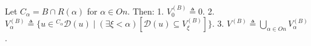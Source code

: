 Let $C_{\alpha} = B \cap R(\alpha)$ for $\alpha \in On$. Then:
1. $V_{0}^{(B)} \triangleq 0$.
2. $V_{\alpha}^{(B)} \triangleq \{u \in {}^{C_{\alpha}}\mathcal{D}(u) \mid (\exists \xi < \alpha)[\mathcal{D}(u) \subseteq V_{\xi}^{(B)}]\}$.
3. $V^{(B)} \triangleq \bigcup_{\alpha \in On} V_{\alpha}^{(B)}$.
